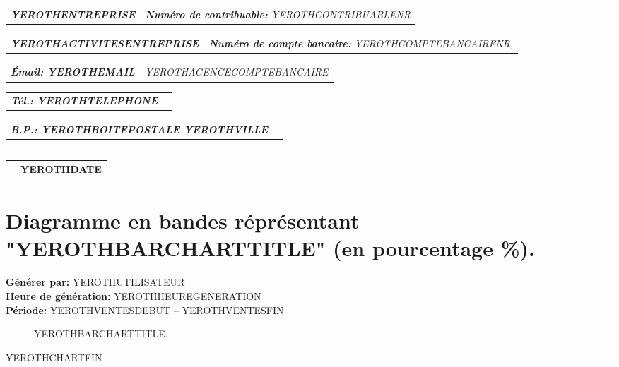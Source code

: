 \documentclass[11pt,YEROTHPAPERSPEC]{article} %
\makeatletter
\newcommand{\headerrow}[2]
{\begin{tabular*}{\linewidth}{l@{\extracolsep{\fill}}r}
	#1 &
	#2 \\
\end{tabular*}}
\newcommand{\emphbold}[1]{\textbf{\emph{#1}}\xspace}
\makeatother
\begin{document}

\bigskip

\headerrow
	{\emphbold{YEROTHENTREPRISE}}
	{\emph{\textbf{Num\'ero de contribuable:} YEROTHCONTRIBUABLENR}}
\headerrow
	{\emphbold{YEROTHACTIVITESENTREPRISE}}
	{\emph{\textbf{Num\'ero de compte bancaire:} YEROTHCOMPTEBANCAIRENR,}}
\headerrow
	{\emphbold{\'Email: YEROTHEMAIL}}
	{\emph{YEROTHAGENCECOMPTEBANCAIRE}}
\headerrow
	{\emphbold{T\'el.: YEROTHTELEPHONE}}
	{}
\headerrow
	{\emphbold{B.P.: YEROTHBOITEPOSTALE YEROTHVILLE}}
	{}
	
\hrule

\headerrow
	{}
	{\textbf{YEROTHDATE}}

\section*{Diagramme en bandes r\'epr\'esentant "YEROTHBARCHARTTITLE" (en pourcentage \%).}
\textbf{G\'en\'erer par:} YEROTHUTILISATEUR\\
\textbf{Heure de g\'en\'eration:} YEROTHHEUREGENERATION\\
\textbf{P\'eriode:} YEROTHVENTESDEBUT -- YEROTHVENTESFIN

\begin{figure}[!htbp]
\setlength{\DTLbaroutlinewidth}{1pt}
\centering
{}
\caption{YEROTHBARCHARTTITLE.}
\end{figure}

YEROTHCHARTFIN
\end{document}
